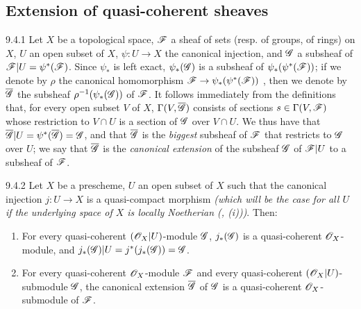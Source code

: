 \subsection{Extension of quasi-coherent sheaves}
\label{1-schemes-9.4}        

\begin{env}{9.4.1}
\label{env-1.9.4.1}
Let
$X$ be a topological space, $\mathscr{F}$ a sheaf of sets (resp. of groups, of rings) on $X$, $U$
an open subset of $X$, $\psi:U\to X$ the canonical injection, and $\mathscr{G}$ a subsheaf of
$\mathscr{F}|U=\psi^*(\mathscr{F})$. Since $\psi_*$ is left exact, $\psi_*(\mathscr{G})$ is a subsheaf of
$\psi_*(\psi^*(\mathscr{F}))$; if we denote by $\rho$ the canonical homomorphism
$\mathscr{F}\to\psi_*(\psi^*(\mathscr{F}))$ , then we denote by $\overline{\mathscr{G}}$
the subsheaf $\rho^{-1}(\psi_*(\mathscr{G}))$ of $\mathscr{F}$. It follows immediately from the
definitions that, for every open subset $V$ of $X$, $\Gamma(V,\overline{\mathscr{G}})$ consists of
sections $s\in\Gamma(V,\mathscr{F})$ whose restriction to $V\cap U$ is a section of $\mathscr{G}$ over
$V\cap U$. We thus have that $\overline{\mathscr{G}}|U=\psi^*(\overline{\mathscr{G}})=\mathscr{G}$, and that
$\overline{\mathscr{G}}$ is the \emph{biggest} subsheaf of $\mathscr{F}$ that restricts to $\mathscr{G}$
over $U$; we say that $\overline{\mathscr{G}}$ is the \emph{canonical extension} of the subsheaf
$\mathscr{G}$ of $\mathscr{F}|U$ to a subsheaf of $\mathscr{F}$.
\end{env}

\begin{envs}[Proposition]{9.4.2}
\label{prop-1.9.4.2}
Let $X$ be a prescheme, $U$ an open subset of $X$ such that the canonical injection
$j:U\to X$ is a quasi-compact morphism \emph{(which will be the case for \emph{all} $U$ if
the underlying space of $X$ is \emph{locally Noetherian}
{\normalfont(, (i))})}. Then:
\begin{enumerate}[label=\rm{(\roman*)}]
  \item For every quasi-coherent $(\mathscr{O}_X|U)$-module $\mathscr{G}$, $j_*(\mathscr{G})$
        is a quasi-coherent $\mathscr{O}_X$-module, and $j_*(\mathscr{G})|U=j^*(j_*(\mathscr{G}))=\mathscr{G}$.
  \item For every quasi-coherent $\mathscr{O}_X$-module $\mathscr{F}$ and every quasi-coherent
        $(\mathscr{O}_X|U)$-submodule $\mathscr{G}$, the canonical extension
        $\overline{\mathscr{G}}$ of $\mathscr{G}$  is a
        quasi-coherent $\mathscr{O}_X$-submodule of $\mathscr{F}$.
\end{enumerate}
\end{envs}

